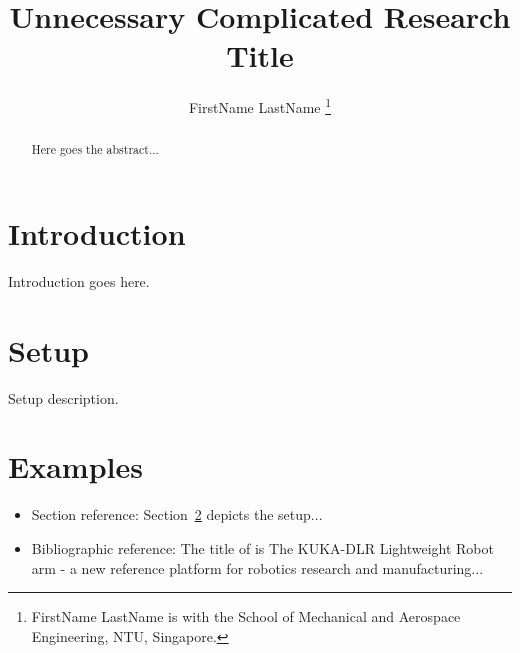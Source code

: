 \documentclass[letterpaper, 10 pt, conference]{ieeeconf}
\title{\LARGE \bf{}
Unnecessary Complicated Research Title
}
\author{FirstName LastName%
  \thanks{FirstName LastName is with the School of
    Mechanical and Aerospace Engineering, NTU, Singapore.}  }
\newcommand{\sref}[1]{Section~\ref{#1}}
\begin{document}
\maketitle
\thispagestyle{empty}
\pagestyle{empty}

\begin{abstract}
  Here goes the abstract...
\end{abstract}

\section{Introduction}
Introduction goes here.


\section{Setup}
\label{sec:setup}
Setup description.

\section{Examples}

\begin{itemize}
  \item Section reference: \sref{sec:setup} depicts the setup...
  \item Bibliographic reference: The title of \cite{Bischoff2010} is The KUKA-DLR Lightweight Robot arm - a new reference platform for robotics research and manufacturing...
\end{itemize}
\end{document}
